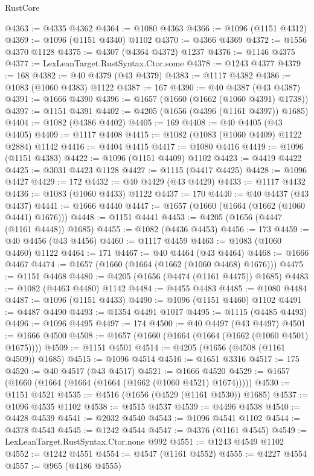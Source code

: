 \begin{lexlean}{RustCore}
\begin{coremodule}
@4363 := @4335 @4362
@4364 := @1080 @4363
@4366 := @1096 (@1151 @4312)
@4369 := @1096 (@1151 @4340) @1102
@4370 := @4366 @4369
@4372 := @1556 @4370 @1128
@4375 := @4307 (@4364 @4372) @1237
@4376 := @1146 @4375
@4377 := LexLeanTarget.RustSyntax.Ctor.some
@4378 := @1243 @4377
@4379 := 168
@4382 := @40 @4379 (@43 @4379)
@4383 := @1117 @4382
@4386 := @1083 (@1060 @4383) @1122
@4387 := 167
@4390 := @40 @4387 (@43 @4387)
@4391 := @1666 @4390
@4396 := @1657 (@1660 (@1662 (@1060 @4391) @1738))
@4397 := @1151 @4391
@4402 := @4205 (@1656 (@4396 (@1161 @4397)) @1685)
@4404 := @1082 (@4386 @4402)
@4405 := 169
@4408 := @40 @4405 (@43 @4405)
@4409 := @1117 @4408
@4415 := @1082 (@1083 (@1060 @4409) @1122 @2884) @1142
@4416 := @4404 @4415
@4417 := @1080 @4416
@4419 := @1096 (@1151 @4383)
@4422 := @1096 (@1151 @4409) @1102
@4423 := @4419 @4422
@4425 := @3031 @4423 @1128
@4427 := @1115 (@4417 @4425)
@4428 := @1096 @4427
@4429 := 172
@4432 := @40 @4429 (@43 @4429)
@4433 := @1117 @4432
@4436 := @1083 (@1060 @4433) @1122
@4437 := 170
@4440 := @40 @4437 (@43 @4437)
@4441 := @1666 @4440
@4447 := @1657 (@1660 (@1664 (@1662 (@1060 @4441) @1676)))
@4448 := @1151 @4441
@4453 := @4205 (@1656 (@4447 (@1161 @4448)) @1685)
@4455 := @1082 (@4436 @4453)
@4456 := 173
@4459 := @40 @4456 (@43 @4456)
@4460 := @1117 @4459
@4463 := @1083 (@1060 @4460) @1122
@4464 := 171
@4467 := @40 @4464 (@43 @4464)
@4468 := @1666 @4467
@4474 := @1657 (@1660 (@1664 (@1662 (@1060 @4468) @1676)))
@4475 := @1151 @4468
@4480 := @4205 (@1656 (@4474 (@1161 @4475)) @1685)
@4483 := @1082 (@4463 @4480) @1142
@4484 := @4455 @4483
@4485 := @1080 @4484
@4487 := @1096 (@1151 @4433)
@4490 := @1096 (@1151 @4460) @1102
@4491 := @4487 @4490
@4493 := @1354 @4491 @1017
@4495 := @1115 (@4485 @4493)
@4496 := @1096 @4495
@4497 := 174
@4500 := @40 @4497 (@43 @4497)
@4501 := @1666 @4500
@4508 := @1657 (@1660 (@1664 (@1664 (@1662 (@1060 @4501) @1675))))
@4509 := @1151 @4501
@4514 := @4205 (@1656 (@4508 (@1161 @4509)) @1685)
@4515 := @1096 @4514
@4516 := @1651 @3316
@4517 := 175
@4520 := @40 @4517 (@43 @4517)
@4521 := @1666 @4520
@4529 := @1657 (@1660 (@1664 (@1664 (@1664 (@1662 (@1060 @4521) @1674)))))
@4530 := @1151 @4521
@4535 := @4516 (@1656 (@4529 (@1161 @4530)) @1685)
@4537 := @1096 @4535 @1102
@4538 := @4515 @4537
@4539 := @4496 @4538
@4540 := @4428 @4539
@4541 := @2032 @4540
@4543 := @1096 @4541 @1102
@4544 := @4378 @4543
@4545 := @1242 @4544
@4547 := @4376 (@1161 @4545)
@4549 := LexLeanTarget.RustSyntax.Ctor.none @992
@4551 := @1243 @4549 @1102
@4552 := @1242 @4551
@4554 := @4547 (@1161 @4552)
@4555 := @4227 @4554
@4557 := @965 (@4186 @4555)

\end{coremodule}
\end{lexlean}

